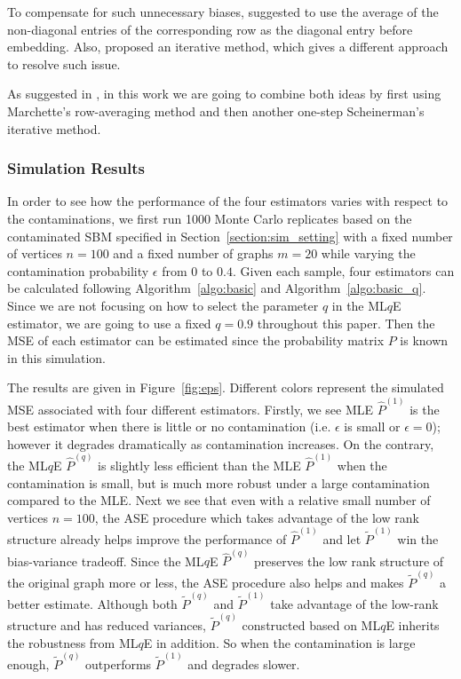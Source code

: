 \documentclass[a4paper]{article}
\renewcommand{\hat}{\widehat}
\begin{document}
To compensate for such unnecessary biases, \citet{marchette2011vertex} suggested to use the average of the non-diagonal entries of the corresponding row as the diagonal entry before embedding. Also, \citet{scheinerman2010modeling} proposed an iterative method, which gives a different approach to resolve such issue.

As suggested in \citep{tang2016law}, in this work we are going to combine both ideas by first using Marchette's row-averaging method and then another one-step Scheinerman's iterative method.

\subsubsection{Simulation Results}

In order to see how the performance of the four estimators varies with respect to the contaminations, we first run 1000 Monte Carlo replicates based on the contaminated SBM specified in Section~\ref{section:sim_setting} with a fixed number of vertices $n = 100$ and a fixed number of graphs $m = 20$ while varying the contamination probability $\epsilon$ from $0$ to $0.4$.
Given each sample, four estimators can be calculated following Algorithm~\ref{algo:basic} and Algorithm~\ref{algo:basic_q}. Since we are not focusing on how to select the parameter $q$ in the ML$q$E estimator, we are going to use a fixed $q = 0.9$ throughout this paper. Then the MSE of each estimator can be estimated since the probability matrix $P$ is known in this simulation.

The results are given in Figure~\ref{fig:eps}. Different colors represent the simulated MSE associated with four different estimators.
Firstly, we see MLE $\hat{P}^{(1)}$ is the best estimator when there is little or no contamination (i.e. $\epsilon$ is small or $\epsilon = 0$); however it degrades dramatically as contamination increases. On the contrary, the ML$q$E $\hat{P}^{(q)}$ is slightly less efficient than the MLE $\hat{P}^{(1)}$ when the contamination is small, but is much more robust under a large contamination compared to the MLE.
Next we see that even with a relative small number of vertices $n = 100$, the ASE procedure which takes advantage of the low rank structure already helps improve the performance of $\hat{P}^{(1)}$ and let $\widetilde{P}^{(1)}$ win the bias-variance tradeoff. Since the ML$q$E $\hat{P}^{(q)}$ preserves the low rank structure of the original graph more or less, the ASE procedure also helps and makes $\widetilde{P}^{(q)}$ a better estimate. Although both $\widetilde{P}^{(q)}$ and $\widetilde{P}^{(1)}$ take advantage of the low-rank structure and has reduced variances, $\widetilde{P}^{(q)}$ constructed based on ML$q$E inherits the robustness from ML$q$E in addition. So when the contamination is large enough, $\widetilde{P}^{(q)}$ outperforms $\widetilde{P}^{(1)}$ and degrades slower.
\end{document}
